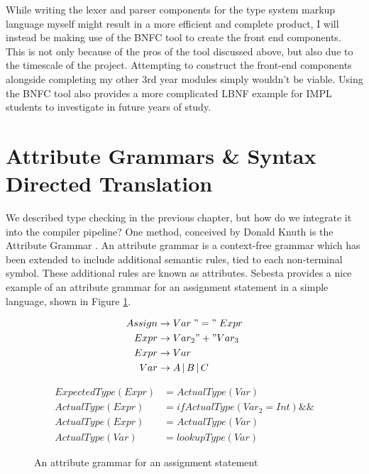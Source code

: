 \documentclass{UoYCSproject}
\begin{document}
While writing the lexer and parser components for the type system markup language
myself might result in a more efficient and complete product, I will instead be
making use of the BNFC tool to create the front end components. This is not only
because of the pros of the tool discussed above, but also due to the timescale
of the project. Attempting to construct the front-end components alongside
completing my other 3rd year modules simply wouldn't be viable. Using the BNFC
tool also provides a more complicated LBNF example for IMPL students to
investigate in future years of study.

\section{Attribute Grammars \& Syntax Directed Translation}
We described type checking in the previous chapter, but how do we
integrate it into the compiler pipeline? One method, conceived by Donald Knuth
is the Attribute Grammar \cite{KnuthGrammars}. An attribute grammar is a
context-free grammar which has been extended to include additional semantic
rules, tied to each non-terminal symbol. These additional rules are known as
attributes. Sebesta provides a nice example of an attribute grammar for an
assignment statement in a simple language, shown in Figure
\ref{fig:AttributeGrammar}.

\begin{figure}
    \begin{minipage}[b]{.5\textwidth}
        \begin{align*}
            Assign &\rightarrow Var \; "=" \; Expr \\
            Expr &\rightarrow Var_2 "+" Var_3 \\
            Expr &\rightarrow Var \\
            Var &\rightarrow A \, | \, B \, | \, C
        \end{align*}
        \label{fig:ProductionRules}
    \end{minipage}
    \begin{minipage}[b]{.5\textwidth}
        \begin{align*}
                ExpectedType(Expr) &= ActualType(Var) \\
                ActualType(Expr) &= if ActualType(Var_2 = Int) \&\& \\
                ActualType(Expr) &= ActualType(Var) \\
                ActualType(Var) &= lookupType(Var)
        \end{align*}
        \label{fig:AttributeDefinitions}
    \end{minipage}
    \caption{An attribute grammar for an assignment statement}
    \label{fig:AttributeGrammar}
\end{figure}
\end{document}

